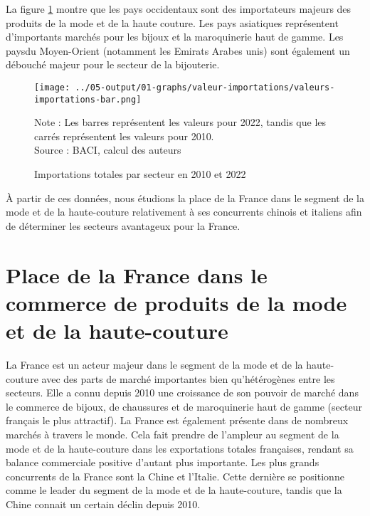 \documentclass[french,10pt,a4paper]{article}
\begin{document}
La figure \ref{fig:valeurs-importations} montre que les pays occidentaux sont des importateurs majeurs des produits de la mode et de la haute couture. Les pays asiatiques représentent d'importants marchés pour les bijoux et la maroquinerie haut de gamme. Les paysdu Moyen-Orient (notamment les Emirats Arabes unis) sont également un débouché majeur pour le secteur de la bijouterie. 

\begin{figure}[!h]
  \centering
  \texttt{[image: ../05-output/01-graphs/valeur-importations/valeurs-importations-bar.png]}
  \caption*{Note : Les barres représentent les valeurs pour 2022, tandis que les carrés représentent les valeurs pour 2010. \\
  Source : BACI, calcul des auteurs}
  \captionsetup{justification=centering, singlelinecheck=true, font=normalsize}
  \caption{Importations totales par secteur en 2010 et 2022}
  \label{fig:valeurs-importations}
\end{figure}

\bigskip

À partir de ces données, nous étudions la place de la France dans le segment de la mode et de la haute-couture relativement à ses concurrents chinois et italiens afin de déterminer les secteurs avantageux pour la France.






\newpage

\section{Place de la France dans le commerce de produits de la mode et de la haute-couture}

La France est un acteur majeur dans le segment de la mode et de la haute-couture avec des parts de marché importantes bien qu'hétérogènes entre les secteurs. Elle a connu depuis 2010 une croissance de son pouvoir de marché dans le commerce de bijoux, de chaussures et de maroquinerie haut de gamme (secteur français le plus attractif). La France est également présente dans de nombreux marchés à travers le monde. Cela fait prendre de l'ampleur au segment de la mode et de la haute-couture dans les exportations totales françaises, rendant sa balance commerciale positive d'autant plus importante. Les plus grands concurrents de la France sont la Chine et l'Italie. Cette dernière se positionne comme le leader du segment de la mode et de la haute-couture, tandis que la Chine connait un certain déclin depuis 2010.
\end{document}
